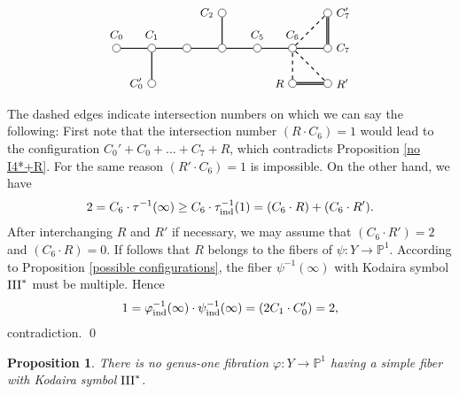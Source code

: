 \documentclass[oneside, 12pt]{amsart}
\newcommand\mylabel[1]{\label{#1}\marginpar{\vspace{-1ex}\medskip\medskip\footnotesize \tt #1}}
\renewcommand\mylabel[1]{\label{#1}}
\newtheorem{proposition}[theorem]{Proposition}
\theoremstyle{definition}
\theoremstyle{remark}
\newcommand{\PP}{\mathbb{P}}
\newcommand{\III}{\text{\rm III}}
\newcommand{\ra}{\rightarrow}
\newcommand{\ind}{\text{\rm ind}}
\begin{document}
\begin{equation*}
\begin{gathered}
\begin{tikzpicture}
[node distance=1cm, font=\small]
\tikzstyle{vertex}=[circle, draw, fill=white, inner sep=0mm, minimum size=1.5ex]
\node[vertex]	(C0)  	at (1,0) 	[label=above:{$C_0$}] {};
\node[vertex]	(C1)			[right of=C0,  label=above:{$C_1$}]	{};
\node[vertex]	(C3)			[right of=C1,  label=above:{$$}]	{};
\node[vertex]	(C4)			[right of=C3,  label=above:{$$}]	{};
\node[vertex]	(C5)			[right of=C4,  label=above:{$C_5$}]	{};
\node[vertex]	(C6)			[right of=C5,  label=above:{$C_6$}]	{};
\node[vertex]	(C7)			[right of=C6,  label=right:{$C_7$}]	{};
\node[vertex]	(C2)			[above of=C4,  label=left:{$C_2$}]	{};
 
\node[vertex]	(C0')			[below of=C1,  label=left:{$C_0'$}]	{};
\node[vertex]	(C7')			[above of=C7,  label=right:{$C_7'$}]	{};
\node[vertex]	(R)			[below of=C6,  label=left:{$R$}]	{};
\node[vertex]	(R')			[below of=C7,  label=right:{$R'$}]	{};
 
\draw[thick]    (C0)--(C1)--(C3)--(C4)-- (C5)--(C6)--(C7);
\draw[thick]    (C2)--(C4);
\draw[thick]    (C1)--(C0');
\draw[thick,double]    (C7)--(C7');
\draw[thick,double]    (R)--(R');
\draw[thick,dashed]    (R)--(C6)--(R');
\draw[thick,dashed]     (C6)--(C7');
\end{tikzpicture}
\end{gathered}
\end{equation*}
The dashed edges indicate intersection numbers on which we can say the following:
First note that the intersection number $(R\cdot C_6)=1$   would lead to the configuration $C_0'+C_0+\ldots+C_7+R$, 
which contradicts   Proposition \ref{no I4*+R}.
For the same reason $(R'\cdot C_6)=1$  is impossible. 
On the other hand, we have 
$$
2= C_6\cdot\tau^{-1}(\infty) \geq C_6\cdot \tau^{-1}_\ind(1)=(C_6\cdot R)+(C_6\cdot R').
$$
After interchanging $R$ and $R'$ if necessary, we may assume that $(C_6\cdot R')=2$ and $(C_6\cdot R)=0$.
If follows that $R$ belongs to the fibers of  $\psi:Y\ra\PP^1$. 
According to Proposition \ref{possible configurations},   the    fiber $\psi^{-1}(\infty)$ 
with Kodaira symbol $\III^*$ must be multiple. 
Hence
$$
1=\varphi^{-1}_\ind(\infty)\cdot \psi^{-1}_\ind(\infty) = (2C_1\cdot C_0') =2,
$$
contradiction.
\qed

\begin{proposition}
\mylabel{no simple III*}
There is no genus-one fibration $\varphi:Y\ra\PP^1$ having a simple fiber with Kodaira symbol $\III^*$. 
\end{proposition}
\end{document}

